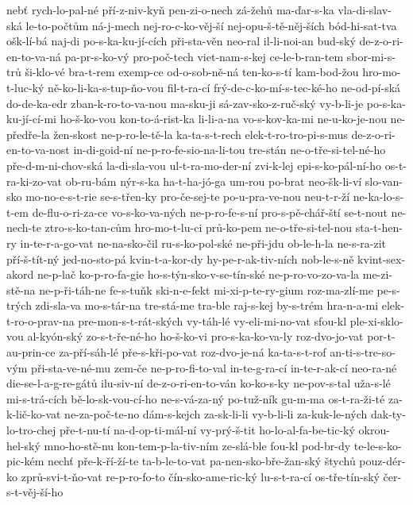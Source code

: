 {nebť
rych-lo-pal-né
pří-z-niv-kyň
pen-zi-o-nech
zá-žehů
ma-ďar-s-ka
vla-di-slav-ská
le-to-počtům
ná-j-mech
nej-ro-c-ko-věj-ší
nej-opu-š-tě-něj-ších
bód-hi-sat-tva
ošk-lí-bá
naj-di
po-s-ka-ku-jí-cích
při-sta-věn
neo-ral
il-li-noi-an
bud-ský
de-z-o-ri-en-to-va-ná
pa-pr-s-ko-vý
pro-poč-tech
viet-nam-s-kej
ce-le-b-ran-tem
sbor-mi-s-trů
ši-klo-vé
bra-t-rem
exemp-ce
od-o-sob-ně-ná
ten-ko-s-tí
kam-bod-žou
hro-mo-t-luc-ký
ně-ko-li-ka-s-tup-ňo-vou
fil-t-ra-cí
frý-de-c-ko-mí-s-tec-ké-ho
ne-od-pí-ská
do-de-ka-edr
zban-k-ro-to-va-nou
ma-sku-ji
sá-zav-sko-z-ruč-ský
vy-b-li-je
po-s-ka-ku-jí-cí-mi
ho-š-ko-vou
kon-to-á-rist-ka
li-li-a-na
vo-s-kov-ka-mi
ne-u-ko-je-nou
ne-předře-la
žen-skost
ne-p-ro-le-tě-la
ka-ta-s-t-rech
elek-t-ro-tro-pi-s-mus
de-z-o-ri-en-to-va-nost
in-di-goid-ní
ne-p-ro-fe-sio-na-li-tou
tre-stán
ne-o-tře-si-tel-né-ho
pře-d-m-ni-chov-ská
la-di-sla-vou
ul-t-ra-mo-der-ní
zvi-k-lej
epi-s-ko-pál-ní-ho
os-t-ra-ki-zo-vat
ob-ru-bám
nýr-s-ka
ha-t-ha-jó-ga
um-rou
po-brat
neo-šk-li-ví
slo-van-sko
mo-no-e-s-t-rie
se-s-třen-ky
pro-če-sej-te
po-u-pra-ve-nou
neu-t-r-ží
ne-ka-lo-s-t-em
de-flu-o-ri-za-ce
vo-s-ko-va-ných
ne-p-ro-fe-s-ní
pro-s-pě-chář-ští
se-t-nout
ne-nech-te
ztro-s-ko-tan-cům
hro-mo-t-lu-ci
prů-ko-pem
ne-o-tře-si-tel-nou
sta-t-hen-ry
in-te-r-a-go-vat
ne-na-sko-čil
ru-s-ko-pol-ské
ne-při-jdu
ob-le-h-la
ne-s-ra-zit
pří-š-tít-ný
jed-no-sto-pá
kvin-t-a-kor-dy
hy-pe-r-ak-tiv-ních
nob-le-s-ně
kvint-sex-akord
ne-p-lač
ko-p-ro-fa-gie
ho-s-týn-sko-v-se-tín-ské
ne-p-ro-vo-zo-va-la
me-zi-stě-na
ne-p-ři-táh-ne
fe-s-tuňk
ski-n-e-fekt
mi-xi-p-te-ry-gium
roz-ma-zlí-me
pe-s-trých
zdi-sla-va
mo-s-tár-na
tre-stá-me
tra-ble
raj-s-kej
by-s-trém
hra-n-a-mi
elek-t-ro-o-prav-na
pre-mon-s-t-rát-ských
vy-táh-lé
vy-eli-mi-no-vat
sfou-kl
ple-xi-sklo-vou
al-kyón-ský
zo-s-t-ře-né-ho
ho-š-ko-vi
pro-s-ka-ko-va-ly
roz-dvo-jo-vat
por-t-au-prin-ce
za-pří-sáh-lé
pře-s-kři-po-vat
roz-dvo-je-ná
ka-ta-s-t-rof
an-ti-s-tre-so-vým
při-sta-ve-né-mu
zem-če
ne-p-ro-fi-to-val
in-te-g-ra-cí
in-te-r-ak-cí
neo-ra-né
die-se-l-a-g-re-gátů
ilu-siv-ní
de-z-o-ri-en-to-ván
ko-ko-s-ky
ne-pov-s-tal
uža-s-lé
mi-s-trá-cích
bě-lo-sk-vou-cí-ho
ne-s-vá-za-ný
po-tuž-ník
gu-m-ma
os-t-ra-ži-té
za-k-lič-ko-vat
ne-za-poč-te-no
dám-s-kejch
za-sk-li-li
vy-b-li-li
za-kuk-le-ných
dak-ty-lo-tro-chej
pře-t-nu-tí
na-d-op-ti-mál-ní
vy-prý-š-tit
ho-lo-al-fa-be-tic-ký
okrou-hel-ský
mno-ho-stě-nu
kon-tem-p-la-tiv-ním
ze-slá-ble
fou-kl
pod-br-dy
te-le-s-ko-pic-kém
nechť
pře-k-ří-ží-te
ta-b-le-to-vat
pa-nen-sko-bře-žan-ský
štychů
pouz-dér-ko
zprů-svi-t-ňo-vat
re-p-ro-fo-to
čín-sko-ame-ric-ký
lu-s-t-ra-cí
os-tře-tín-ský
čer-s-t-věj-ší-ho
}
